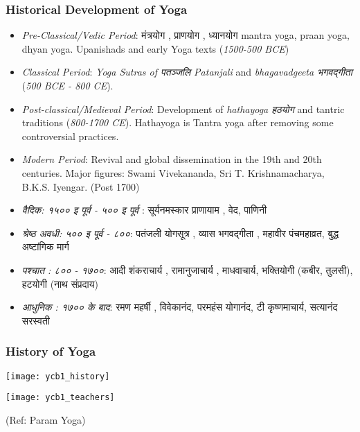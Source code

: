 \begin{frame}[fragile]\frametitle{Historical Development of Yoga}

      \begin{itemize}
	    \item \textit{Pre-Classical/Vedic Period}: मंत्रयोग ,  प्राणयोग , ध्यानयोग  mantra yoga, praan yoga, dhyan yoga. Upanishads and early Yoga texts (\textit{1500-500 BCE})
		\item \textit{Classical Period}: \textit{Yoga Sutras of  पतञ्जलि  Patanjali} and \textit{bhagavadgeeta भगवद्गीता } (\textit{500 BCE - 800 CE}).
		\item \textit{Post-classical/Medieval Period}: Development of \textit{hathayoga हठयोग } and tantric traditions (\textit{800-1700 CE}). Hathayoga is Tantra yoga after removing some controversial practices.
		\item \textit{Modern Period}: Revival and global dissemination in the 19th and 20th centuries. Major figures: Swami Vivekananda, Sri T. Krishnamacharya, B.K.S. Iyengar. (Post 1700)
		\item \textit{वैदिक: १५०० इ पूर्व - ५०० इ पूर्व }: सूर्यनमस्कार प्राणायाम , वेद, पाणिनी 
		\item \textit{श्रेष्ठ अवधी: ५०० इ पूर्व - ८००}: पतंजली  योगसूत्र , व्यास भगवद्गीता , महावीर पंचमहाव्रत, बुद्ध अष्टांगिक मार्ग 
		\item \textit{पश्चात : ८०० - १७००}: आदी शंकराचार्य , रामानुजाचार्य , माधवाचार्य, भक्तियोगी (कबीर, तुलसी), हटयोगी (नाथ संप्रदाय)
		\item \textit{आधुनिक : १७०० के बाद}: रमण महर्षी , विवेकानंद, परमहंस योगानंद, टी कृष्णमाचार्य, सत्यानंद सरस्वती 
		
	  \end{itemize}

\end{frame}

\begin{frame}[fragile]\frametitle{History of Yoga}
      \begin{center}
        \texttt{[image: ycb1\_history]}

        \texttt{[image: ycb1\_teachers]}

		{\tiny (Ref: Param Yoga)}		
        \end{center}

\end{frame}


